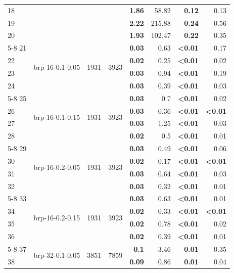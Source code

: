 \begin{longtable}{lrr@{\hskip 12pt}r@{\hskip 12pt}r@{\hskip 12pt}r@{\hskip 12pt}r@{\hskip 12pt}r}
18 &  &  &  & \textbf{1.86} & 58.82 & \textbf{0.12} & 0.13 \\
19 &  &  &  & \textbf{2.22} & 215.88 & \textbf{0.24} & 0.56 \\
20 &  &  &  & \textbf{1.93} & 102.47 & \textbf{0.22} & 0.35 \\
\cmidrule{5-8}
21 & \multirow{4}{*}{brp-16-0.1-0.05} & \multirow{4}{*}{1931} & \multirow{4}{*}{3923} & \textbf{0.03} & 0.63 & \textbf{<0.01} & 0.17 \\
22 &  &  &  & \textbf{0.02} & 0.25 & \textbf{<0.01} & 0.02 \\
23 &  &  &  & \textbf{0.03} & 0.94 & \textbf{<0.01} & 0.19 \\
24 &  &  &  & \textbf{0.03} & 0.39 & \textbf{<0.01} & 0.03 \\
\cmidrule{5-8}
25 & \multirow{4}{*}{brp-16-0.1-0.15} & \multirow{4}{*}{1931} & \multirow{4}{*}{3923} & \textbf{0.03} & 0.7 & \textbf{<0.01} & 0.02 \\
26 &  &  &  & \textbf{0.03} & 0.36 & \textbf{<0.01} & \textbf{<0.01} \\
27 &  &  &  & \textbf{0.03} & 1.25 & \textbf{<0.01} & 0.03 \\
28 &  &  &  & \textbf{0.02} & 0.5 & \textbf{<0.01} & 0.01 \\
\cmidrule{5-8}
29 & \multirow{4}{*}{brp-16-0.2-0.05} & \multirow{4}{*}{1931} & \multirow{4}{*}{3923} & \textbf{0.03} & 0.49 & \textbf{<0.01} & 0.06 \\
30 &  &  &  & \textbf{0.02} & 0.17 & \textbf{<0.01} & \textbf{<0.01} \\
31 &  &  &  & \textbf{0.03} & 0.64 & \textbf{<0.01} & 0.03 \\
32 &  &  &  & \textbf{0.03} & 0.32 & \textbf{<0.01} & 0.01 \\
\cmidrule{5-8}
33 & \multirow{4}{*}{brp-16-0.2-0.15} & \multirow{4}{*}{1931} & \multirow{4}{*}{3923} & \textbf{0.03} & 0.63 & \textbf{<0.01} & 0.01 \\
34 &  &  &  & \textbf{0.02} & 0.33 & \textbf{<0.01} & \textbf{<0.01} \\
35 &  &  &  & \textbf{0.02} & 0.78 & \textbf{<0.01} & 0.02 \\
36 &  &  &  & \textbf{0.02} & 0.39 & \textbf{<0.01} & 0.01 \\
\cmidrule{5-8}
37 & \multirow{4}{*}{brp-32-0.1-0.05} & \multirow{4}{*}{3851} & \multirow{4}{*}{7859} & \textbf{0.1} & 3.46 & \textbf{0.01} & 0.35 \\
38 &  &  &  & \textbf{0.09} & 0.86 & \textbf{0.01} & 0.04 \\

\end{longtable}
